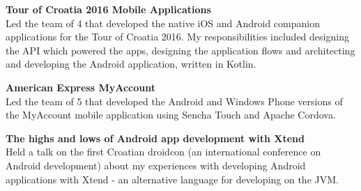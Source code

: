 \documentclass[10pt, a4paper, final, onecolumn, oneside, notitlepage]{article}
\newcommand{\halfsectionspacing}[0]{ \vspace{4pt} }
\begin{document}
\begin{center}
\begin{flushleft}
\textbf{Tour of Croatia 2016 Mobile Applications} \\
Led the team of 4 that developed the native iOS and Android companion applications for the Tour of Croatia 2016. My responsibilities included designing the API which powered the apps, designing the application flows and architecting and developing the Android application, written in Kotlin.

\halfsectionspacing

\textbf{American Express MyAccount} \\
Led the team of 5 that developed the Android and Windows Phone versions of the MyAccount mobile application using Sencha Touch and Apache Cordova.

\halfsectionspacing

\textbf{The highs and lows of Android app development with Xtend} \\
Held a talk on the first Croatian droidcon (an international conference on Android development) about my experiences with developing Android applications with Xtend - an alternative language for developing on the JVM.

\end{flushleft}



\end{center}
\end{document}
